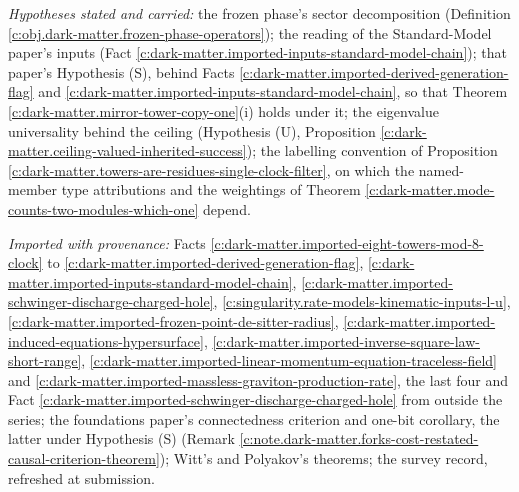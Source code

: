 \documentclass[11pt]{article}
\theoremstyle{definition}
\theoremstyle{plain}
\begin{document}
\emph{Hypotheses stated and carried:} the frozen phase's sector decomposition (Definition \ref{c:obj.dark-matter.frozen-phase-operators}); the reading of the Standard-Model paper's inputs (Fact \ref{c:dark-matter.imported-inputs-standard-model-chain}); that paper's Hypothesis (S), behind Facts \ref{c:dark-matter.imported-derived-generation-flag} and \ref{c:dark-matter.imported-inputs-standard-model-chain}, so that Theorem \ref{c:dark-matter.mirror-tower-copy-one}(i) holds under it; the eigenvalue universality behind the ceiling (Hypothesis (U), Proposition \ref{c:dark-matter.ceiling-valued-inherited-success}); the labelling convention of Proposition \ref{c:dark-matter.towers-are-residues-single-clock-filter}, on which the named-member type attributions and the weightings of Theorem \ref{c:dark-matter.mode-counts-two-modules-which-one} depend.

\emph{Imported with provenance:} Facts \ref{c:dark-matter.imported-eight-towers-mod-8-clock} to \ref{c:dark-matter.imported-derived-generation-flag}, \ref{c:dark-matter.imported-inputs-standard-model-chain}, \ref{c:dark-matter.imported-schwinger-discharge-charged-hole}, \ref{c:singularity.rate-models-kinematic-inputs-l-u}, \ref{c:dark-matter.imported-frozen-point-de-sitter-radius}, \ref{c:dark-matter.imported-induced-equations-hypersurface}, \ref{c:dark-matter.imported-inverse-square-law-short-range}, \ref{c:dark-matter.imported-linear-momentum-equation-traceless-field} and \ref{c:dark-matter.imported-massless-graviton-production-rate}, the last four and Fact \ref{c:dark-matter.imported-schwinger-discharge-charged-hole} from outside the series; the foundations paper's connectedness criterion and one-bit corollary, the latter under Hypothesis (S) (Remark \ref{c:note.dark-matter.forks-cost-restated-causal-criterion-theorem}); Witt's and Polyakov's theorems; the survey record, refreshed at submission.
\end{document}
